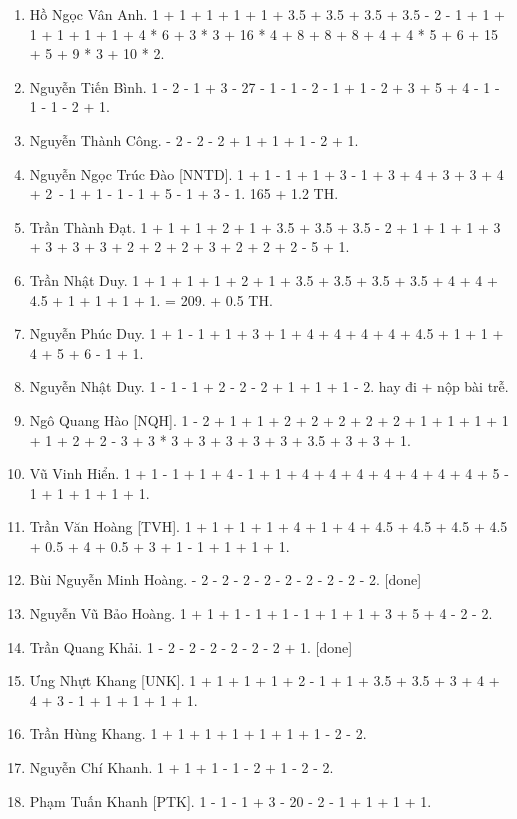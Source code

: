 \documentclass{article}
\begin{document}
\begin{enumerate}
	\item {\sc Hồ Ngọc Vân Anh.} 1 + 1 + 1 + 1 + 1 + 3.5 + 3.5 + 3.5 + 3.5 - 2 - 1 + 1 + 1 + 1 + 1 + 1 + 4 * 6 + 3 * 3 + 16 * 4 + 8 + 8 + 8 + 4 + 4 * 5 + 6 + 15 + 5 + 9 * 3 + 10 * 2.
	\item {\sc Nguyễn Tiến Bình.} 1 - 2 - 1 + 3 - 27 - 1 - 1 - 2 - 1 + 1 - 2 + 3 + 5 + 4 - 1 - 1 - 1 - 2 + 1.
	\item {\sc Nguyễn Thành Công.} - 2 - 2 - 2 + 1 + 1 + 1 - 2 + 1.
	\item {\sc Nguyễn Ngọc Trúc Đào [NNTD].} 1 + 1 - 1 + 1 + 3 - 1 + 3 + 4 + 3 + 3 + 4 + 2 - 1 + 1 - 1 - 1 + 5 - 1 + 3 - 1. 165 + 1.2 TH.
	\item {\sc Trần Thành Đạt.} 1 + 1 + 1 + 2 + 1 + 3.5 + 3.5 + 3.5 - 2 + 1 + 1 + 1 + 3 + 3 + 3 + 3 + 2 + 2 + 2 + 3 + 2 + 2 + 2 - 5 + 1.
	\item {\sc Trần Nhật Duy.} 1 + 1 + 1 + 1 + 2 + 1 + 3.5 + 3.5 + 3.5 + 3.5 + 4 + 4 + 4.5 + 1 + 1 + 1 + 1. = 209. + 0.5 TH.
	\item {\sc Nguyễn Phúc Duy.} 1 + 1 - 1 + 1 + 3 + 1 + 4 + 4 + 4 + 4 + 4.5 + 1 + 1 + 4 + 5 + 6 - 1 + 1.
	\item {\sc Nguyễn Nhật Duy.} 1 - 1 - 1 + 2 - 2 - 2 + 1 + 1 + 1 - 2. hay đi + nộp bài trễ.
	\item {\sc Ngô Quang Hào [NQH].} 1 - 2 + 1 + 1 + 2 + 2 + 2 + 2 + 2 + 1 + 1 + 1 + 1 + 1 + 2 + 2 - 3 + 3 * 3 + 3 + 3 + 3 + 3 + 3.5 + 3 + 3 + 1.
	\item {\sc Vũ Vinh Hiển.} 1 + 1 - 1 + 1 + 4 - 1 + 1 + 4 + 4 + 4 + 4 + 4 + 4 + 4 + 5 - 1 + 1 + 1 + 1 + 1.
	\item {\sc Trần Văn Hoàng [TVH].} 1 + 1 + 1 + 1 + 4 + 1 + 4 + 4.5 + 4.5 + 4.5 + 4.5 + 0.5 + 4 + 0.5 + 3 + 1 - 1 + 1 + 1 + 1.
	\item {\sc Bùi Nguyễn Minh Hoàng.} - 2 - 2 - 2 - 2 - 2 - 2 - 2 - 2 - 2. [done]
	\item {\sc Nguyễn Vũ Bảo Hoàng.} 1 + 1 + 1 - 1 + 1 - 1 + 1 + 1 + 3 + 5 + 4 - 2 - 2.
	\item {\sc Trần Quang Khải.} 1 - 2 - 2 - 2 - 2 - 2 - 2 + 1. [done]
	\item {\sc Ưng Nhựt Khang [UNK].} 1 + 1 + 1 + 1 + 2 - 1 + 1 + 3.5 + 3.5 + 3 + 4 + 4 + 3 - 1 + 1 + 1 + 1 + 1.
	\item {\sc Trần Hùng Khang.} 1 + 1 + 1 + 1 + 1 + 1 + 1 - 2 - 2.
	\item {\sc Nguyễn Chí Khanh.} 1 + 1 + 1 - 1 - 2 + 1 - 2 - 2.
	\item {\sc Phạm Tuấn Khanh [PTK].} 1 - 1 - 1 + 3 - 20 - 2 - 1 + 1 + 1 + 1.

\end{enumerate}
\end{document}
